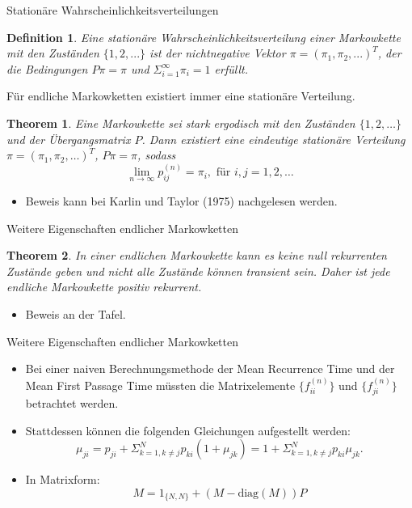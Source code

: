\documentclass{beamer}
\newtheorem{defi}{Definition}
\newtheorem{thm}{Theorem}
\begin{document}
\begin{frame}{Stationäre Wahrscheinlichkeitsverteilungen}
  \begin{defi}
    Eine stationäre Wahrscheinlichkeitsverteilung einer Markowkette mit den Zuständen $\{1,2,...\}$ ist der nichtnegative Vektor $π = (π_1,π_2,...)^T$, der die Bedingungen $Pπ = π$ und $Σ_{i=1}^∞π_i = 1$ erfüllt.
  \end{defi}
  \begin{fact}
    Für endliche Markowketten existiert immer eine stationäre Verteilung.
  \end{fact}
\end{frame}
\begin{frame}
  \begin{thm}
    Eine Markowkette sei stark ergodisch mit den Zuständen
    $\{1,2,\dots\}$ und der Übergangsmatrix $P$. Dann existiert eine
    eindeutige stationäre Verteilung $π = (π_1,π_2,\dots)^T$, $Pπ = π$,
    sodass
    \[
      \lim_{n →∞}p_{ij}^{(n)} = π_i, \text{ für } i,j=1,2,\dots
    \]
  \end{thm}
  \begin{itemize}
    \item Beweis kann bei Karlin und Taylor (1975) nachgelesen werden.
  \end{itemize}
\end{frame}
\begin{frame}{Weitere Eigenschaften endlicher Markowketten}
  \begin{thm}
    In einer endlichen Markowkette kann es keine
    null rekurrenten Zustände geben und nicht alle Zustände
    können transient sein. Daher ist jede endliche Markowkette positiv
    rekurrent.  
  \end{thm}
  \begin{itemize}
    \item Beweis an der Tafel.
  \end{itemize}
\end{frame}
\begin{frame}{Weitere Eigenschaften endlicher Markowketten}
  \begin{itemize}
  \item Bei einer naiven Berechnungsmethode der Mean Recurrence Time und der Mean First Passage Time müssten die Matrixelemente $\{f_{ii}^{(n)}\}$ und $\{f_{ji}^{(n)}\}$ betrachtet werden.
  \item Stattdessen können die folgenden Gleichungen aufgestellt werden:
    \[
      μ_{ji} = p_{ji} + Σ_{k=1,k≠j}^Np_{ki}(1+μ_{jk}) = 1+Σ_{k=1,k≠j}^Np_{ki}μ_{jk}.
    \]
  \item In Matrixform:
    \[
      M = 1_{\{N,N\}} + (M - \text{diag}(M))P
    \]
  \end{itemize}
\end{frame}
\end{document}
